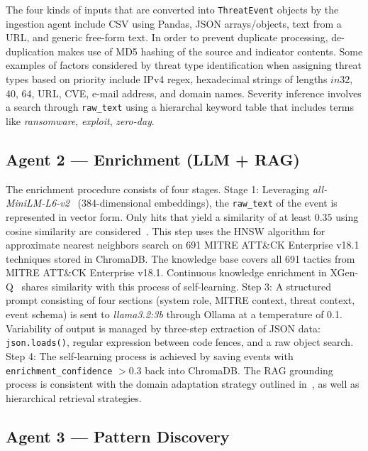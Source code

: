 \documentclass[conference]{IEEEtran}
\begin{document}
{The four kinds of inputs that are converted into \texttt{ThreatEvent} objects by the ingestion agent include CSV using Pandas, JSON arrays/objects, text from a URL, and generic free-form text. In order to prevent duplicate processing, de-duplication makes use of MD5 hashing of the source and indicator contents. Some examples of factors considered by threat type identification when assigning threat types based on priority include IPv4 regex, hexadecimal strings of lengths $in${32, 40, 64}, URL, CVE, e-mail address, and domain names. Severity inference involves a search through \texttt{raw\_text} using a hierarchal keyword table that includes terms like \textit{ransomware}, \textit{exploit}, \textit{zero-day}.

\subsection{Agent 2 --- Enrichment (LLM + RAG)}
\label{subsec:enrichment}

The enrichment procedure consists of four stages. Stage 1: Leveraging \textit{all-MiniLM-L6-v2}~\cite{reimers2019sbert} (384-dimensional embeddings), the \texttt{raw\_text} of the event is represented in vector form. Only hits that yield a similarity of at least $0.35$ using cosine similarity are considered~\cite{lewis2020rag}. This step uses the HNSW algorithm for approximate nearest neighbors search on 691 MITRE ATT&CK Enterprise v18.1 techniques stored in ChromaDB. The knowledge base covers all 691 tactics from MITRE ATT\&CK Enterprise v18.1.
Continuous knowledge enrichment in XGen-Q~\cite{jelodar2025xgen} shares similarity with this process of self-learning. {Step 3}: A structured prompt consisting of four sections (system role, MITRE context, threat context, event schema) is sent to \textit{llama3.2:3b} through Ollama at a temperature of 0.1. Variability of output is managed by three-step extraction of JSON data: \texttt{json.loads()}, regular expression between code fences, and a raw object search. {Step 4}: The self-learning process is achieved by saving events with \texttt{enrichment\_confidence} $> 0.3$ back into ChromaDB. The RAG grounding process is consistent with the domain adaptation strategy outlined in~\cite{iyer2026cyber}, as well as hierarchical retrieval strategies.

\subsection{Agent 3 --- Pattern Discovery}

}
\end{document}
